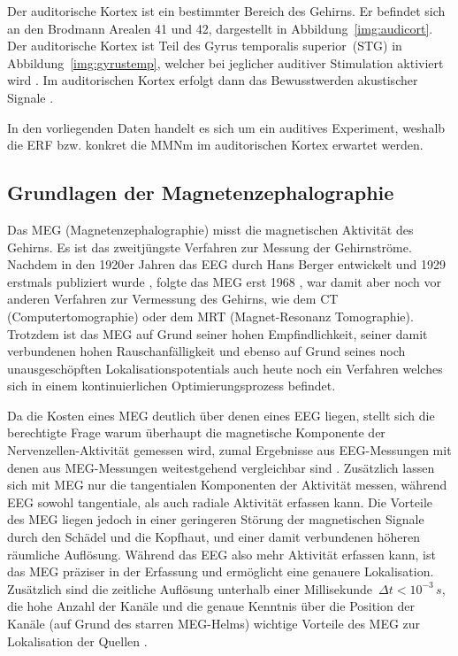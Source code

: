 \documentclass[doc,a4paper,12pt]{apa6}
\begin{document}
Der auditorische Kortex ist ein bestimmter Bereich des Gehirns. Er befindet sich an den Brodmann Arealen 41 und 42, dargestellt in Abbildung~\ref{img:audicort}. Der auditorische Kortex ist Teil des Gyrus temporalis superior~(STG) in Abbildung~\ref{img:gyrustemp}, welcher bei jeglicher auditiver Stimulation aktiviert wird \parencite{binder1994functional}. Im auditorischen Kortex erfolgt dann das Bewusstwerden akustischer Signale \parencite{jaaskelainen2004human}.

In den vorliegenden Daten handelt es sich um ein auditives Experiment, weshalb die ERF bzw. konkret die MMNm im auditorischen Kortex erwartet werden.


\subsection{Grundlagen der Magnetenzephalographie}

Das MEG (Magnetenzephalographie) misst die magnetischen Aktivität des Gehirns. Es ist das zweitjüngste Verfahren zur Messung der Gehirnströme. Nachdem in den 1920er Jahren das EEG durch Hans Berger entwickelt und 1929 erstmals publiziert wurde \parencite{berger1929elektrenkephalogramm}, folgte das MEG erst 1968 \parencite{cohen1968magnetoencephalography}, war damit aber noch vor anderen Verfahren zur Vermessung des Gehirns, wie dem CT (Computertomographie) oder dem MRT (Magnet-Resonanz Tomographie). Trotzdem ist das MEG auf Grund seiner hohen Empfindlichkeit, seiner damit verbundenen hohen Rauschanfälligkeit und ebenso auf Grund seines noch unausgeschöpften Lokalisationspotentials auch heute noch ein Verfahren welches sich in einem kontinuierlichen Optimierungsprozess befindet.

Da die Kosten eines MEG deutlich über denen eines EEG liegen, stellt sich die berechtigte Frage warum überhaupt die magnetische Komponente der Nervenzellen-Aktivität gemessen wird, zumal Ergebnisse aus EEG-Messungen mit denen aus MEG-Messungen weitestgehend vergleichbar sind \parencite{huotilainen1998combined}. Zusätzlich lassen sich mit MEG nur die tangentialen Komponenten der Aktivität messen, während EEG sowohl tangentiale, als auch radiale Aktivität erfassen kann. Die Vorteile des MEG liegen jedoch in einer geringeren Störung der magnetischen Signale durch den Schädel und die Kopfhaut, und einer damit verbundenen höheren räumliche Auflösung. Während das EEG also mehr Aktivität erfassen kann, ist das MEG präziser in der Erfassung und ermöglicht eine genauere Lokalisation. Zusätzlich sind die zeitliche Auflösung unterhalb einer Millisekunde~$\Delta t < 10^{-3}\,s$, die hohe Anzahl der Kanäle und die genaue Kenntnis über die Position der Kanäle (auf Grund des starren MEG-Helms) wichtige Vorteile des MEG zur Lokalisation der Quellen  \parencite{malmivuo2012comparison}.
\end{document}
